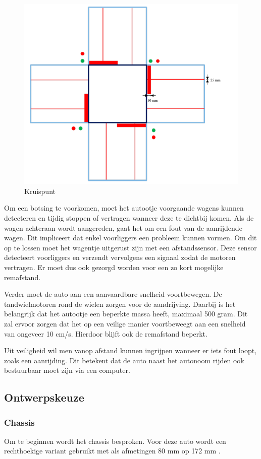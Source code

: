\documentclass[a4paper,twoside,kulak]{kulakreport} %
\begin{document}
\begin{figure}
	\centering
	\includegraphics[width=.6\textwidth]{volglijnenEnStoplijnen}
	\caption{Kruispunt}
	\label{fig:plattegrond}
\end{figure}

Om een botsing te voorkomen, moet het autootje voorgaande wagens kunnen detecteren en tijdig stoppen of vertragen wanneer deze te dichtbij komen. Als de wagen achteraan wordt aangereden, gaat het om een fout van de aanrijdende wagen. Dit impliceert dat enkel voorliggers een probleem kunnen vormen. Om dit op te lossen moet het wagentje uitgerust zijn met een afstandssensor. Deze sensor detecteert voorliggers en verzendt vervolgens een signaal zodat de motoren vertragen. Er moet dus ook gezorgd worden voor een zo kort mogelijke remafstand. %

Verder moet de auto aan een aanvaardbare snelheid voortbewegen. De tandwielmotoren rond de wielen zorgen voor de aandrijving. Daarbij is het belangrijk dat het autootje een beperkte massa heeft, maximaal 500 gram. Dit zal ervoor zorgen dat het op een veilige manier voortbeweegt aan een snelheid van ongeveer 10 cm/s. Hierdoor blijft ook de remafstand beperkt.

Uit veiligheid wil men vanop afstand kunnen ingrijpen wanneer er iets fout loopt, zoals een aanrijding. Dit betekent dat de auto naast het autonoom rijden ook bestuurbaar moet zijn via een computer. 



\subsection{Ontwerpskeuze}
\label{Ontwerpskeuze}

\subsubsection{Chassis}
Om te beginnen wordt het chassis besproken. Voor deze auto wordt een rechthoekige variant gebruikt met als afmetingen 80 mm op 172 mm  \cite{RobotChassisRechthoekigZwart}. 
\end{document}
